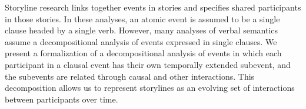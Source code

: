 Storyline research links together events in stories and specifies shared participants in those stories. In these analyses, an atomic event is assumed to be a single clause headed by a single verb. However, many analyses of verbal semantics assume a decompositional analysis of events expressed in single clauses. We present a formalization of a decompositional analysis of events in which each participant in a clausal event has their own temporally extended subevent, and the subevents are related through causal and other interactions. This decomposition allows us to represent storylines as an evolving set of interactions between participants over time.
